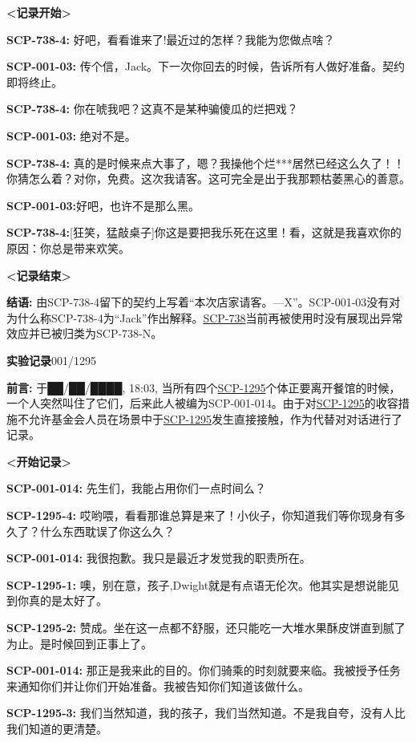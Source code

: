\documentclass[openany,a4paper]{book} %
\begin{document}
\begin{colorboxed}
\textbf{<记录开始>}

\textbf{SCP-738-4: }好吧，看看谁来了!最近过的怎样？我能为您做点啥？

\textbf{SCP-001-03:} 传个信，Jack。下一次你回去的时候，告诉所有人做好准备。契约即将终止。

\textbf{SCP-738-4:} 你在唬我吧？这真不是某种骗傻瓜的烂把戏？

\textbf{SCP-001-03:} 绝对不是。

\textbf{SCP-738-4:} 真的是时候来点大事了，嗯？我操他个烂***居然已经这么久了！！你猜怎么着？对你，免费。这次我请客。这可完全是出于我那颗枯萎黑心的善意。

\textbf{SCP-001-03:}好吧，也许不是那么黑。

\textbf{SCP-738-4:}[狂笑，猛敲桌子]你这是要把我乐死在这里！看，这就是我喜欢你的原因：你总是带来欢笑。

\textbf{<记录结束>}

\textbf{结语:} 由SCP-738-4留下的契约上写着“本次店家请客。—X”。SCP-001-03没有对为什么称SCP-738-4为“Jack”作出解释。\hyperref[chhap:SCP-738]{SCP-738}当前再被使用时没有展现出异常效应并已被归类为SCP-738-N。\vspace{12pt}

\textbf{实验记录}001/1295

\textbf{前言: }于██/██/████, 18:03, 当所有四个\hyperref[chhap:SCP-1295]{SCP-1295}个体正要离开餐馆的时候，一个人突然叫住了它们，后来此人被编为SCP-001-014。由于对\hyperref[chhap:SCP-1295]{SCP-1295}的收容措施不允许基金会人员在场景中于\hyperref[chhap:SCP-1295]{SCP-1295}发生直接接触，作为代替对对话进行了记录。

\textbf{<开始记录>}

\textbf{SCP-001-014:} 先生们，我能占用你们一点时间么？

\textbf{SCP-1295-4: }哎哟喂，看看那谁总算是来了！小伙子，你知道我们等你现身有多久了？什么东西耽误了你这么久？

\textbf{SCP-001-014:} 我很抱歉。我只是最近才发觉我的职责所在。

\textbf{SCP-1295-1: }噢，别在意，孩子,Dwight就是有点语无伦次。他其实是想说能见到你真的是太好了。

\textbf{SCP-1295-2: }赞成。坐在这一点都不舒服，还只能吃一大堆水果酥皮饼直到腻了为止。是时候回到正事上了。

\textbf{SCP-001-014: }那正是我来此的目的。你们骑乘的时刻就要来临。我被授予任务来通知你们并让你们开始准备。我被告知你们知道该做什么。

\textbf{SCP-1295-3:} 我们当然知道，我的孩子，我们当然知道。不是我自夸，没有人比我们知道的更清楚。


\end{colorboxed}
\end{document}
